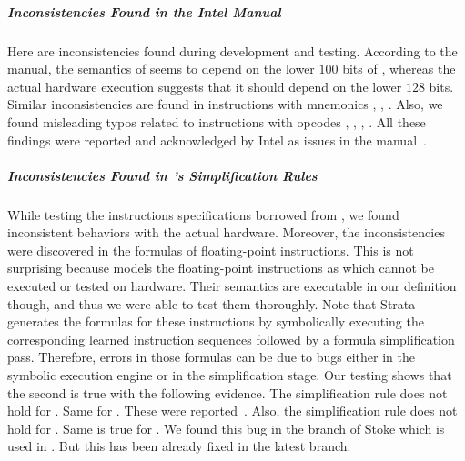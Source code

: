 \vspace{-2pt}
\subparagraph{Inconsistencies Found in the Intel Manual} Here are inconsistencies found during development and testing.  
According to the manual, the semantics of     seems to depend on the lower $100$ bits of , whereas the actual hardware execution suggests that it should depend on the lower $128$ bits. Similar inconsistencies are found in instructions with mnemonics , , .
Also, we found misleading typos related to instructions with opcodes , , , .    
All these findings were reported and acknowledged by Intel as issues in the manual~\cite{BugIntel}.
 
\vspace{-2pt}
\subparagraph{Inconsistencies Found in \Strata's Simplification Rules}
While testing the instructions specifications borrowed from \Strata, we found inconsistent behaviors with the actual hardware. Moreover, the inconsistencies were discovered in the formulas of floating-point instructions. This is not surprising because \Strata models the floating-point instructions as \uif{} which cannot be executed or tested on hardware. Their semantics are executable in our definition though, and thus we were able to test them thoroughly. Note that Strata generates the formulas for these instructions by symbolically  executing  the corresponding learned  instruction sequences followed by a formula simplification pass. Therefore, errors in those formulas can be due to bugs either in the symbolic execution engine or in the simplification stage. Our testing shows that the second is true with the following evidence.
The simplification rule  does not hold for . Same for . These were reported~\cite{PC1}.
Also, the simplification rule  does not hold for .  Same is true for . We found this bug in the  branch of Stoke which is used in \Strata. But this has been already fixed in the latest \Stoke branch.

